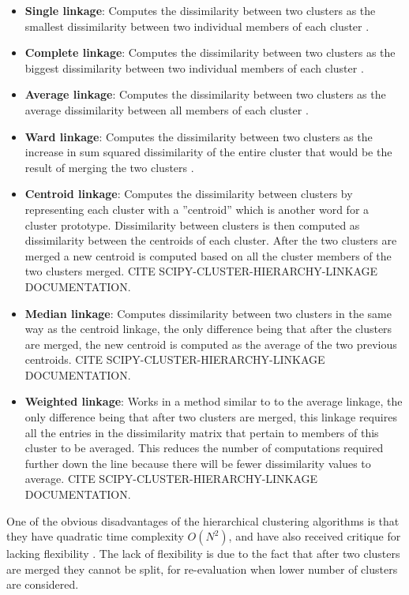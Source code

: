 \begin{itemize}
    \item \textbf{Single linkage}: Computes the dissimilarity between two clusters as the smallest dissimilarity between two individual members of each cluster \cite{dependency_tsc_energy_markets}.
    \item \textbf{Complete linkage}: Computes the dissimilarity between two clusters as the biggest dissimilarity between two individual members of each cluster \cite{financial_tsc_variance_ratio}.
    \item \textbf{Average linkage}: Computes the dissimilarity between two clusters as the average dissimilarity between all members of each cluster \cite{dependency_tsc_energy_markets}.
    \item \textbf{Ward linkage}: Computes the dissimilarity between two clusters as the increase in sum squared dissimilarity of the entire cluster that would be the result of merging the two clusters \cite{copula_ica_tsc}.
    \item \textbf{Centroid linkage}: Computes the dissimilarity between clusters by representing each cluster with a ''centroid'' which is another word for a cluster prototype. Dissimilarity between clusters is then computed as dissimilarity between the centroids of each cluster. After the two clusters are merged a new centroid is computed based on all the cluster members of the two clusters merged. CITE SCIPY-CLUSTER-HIERARCHY-LINKAGE DOCUMENTATION.
    \item \textbf{Median linkage}: Computes dissimilarity between two clusters in the same way as the centroid linkage, the only difference being that after the clusters are merged, the new centroid is computed as the average of the two previous centroids. CITE SCIPY-CLUSTER-HIERARCHY-LINKAGE DOCUMENTATION.
    \item \textbf{Weighted linkage}: Works in a method similar to to the average linkage, the only difference being that after two clusters are merged, this linkage requires all the entries in the dissimilarity matrix that pertain to members of this cluster to be averaged. This reduces the number of computations required further down the line because there will be fewer dissimilarity values to average. CITE SCIPY-CLUSTER-HIERARCHY-LINKAGE DOCUMENTATION.
\end{itemize}

One of the obvious disadvantages of the hierarchical clustering algorithms is that they have quadratic time complexity $O(N^2)$, and have also received critique for lacking flexibility \cite{tsc_rev}. The lack of flexibility is due to the fact that after two clusters are merged they cannot be split, for re-evaluation when lower number of clusters are considered. 

